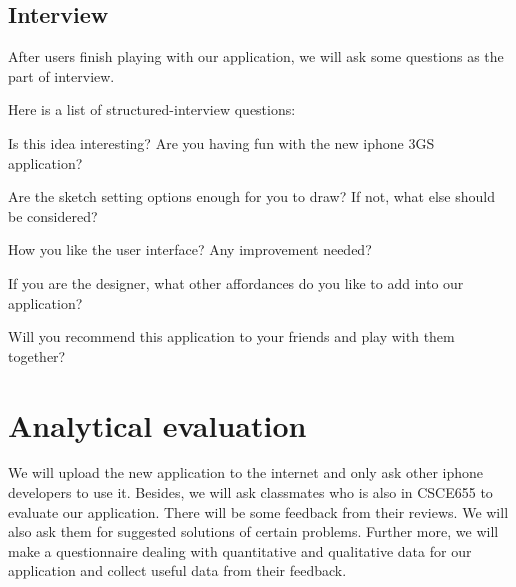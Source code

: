 \documentclass{article}
\begin{document}
\subsection{Interview}

After users finish playing with our application, we will ask some questions as the part of interview.

Here is a list of structured-interview questions:

Is this idea interesting? Are you having fun with the new iphone 3GS application?

Are the sketch setting options enough for you to draw? If not, what else should be considered?

How you like the user interface? Any improvement needed?

If you are the designer, what other affordances do you like to add into our application?

Will you recommend this application to your friends and play with them together?

\section {Analytical evaluation}

We will upload the new application to the internet and only ask other iphone developers to use it. Besides, we will ask classmates who is also in CSCE655 to evaluate our application. There will be some feedback from their reviews. We will also ask them for suggested solutions of certain problems. Further more, we will make a questionnaire dealing with quantitative and qualitative data for our application and collect useful data from their feedback.
 

 
\end{document}
